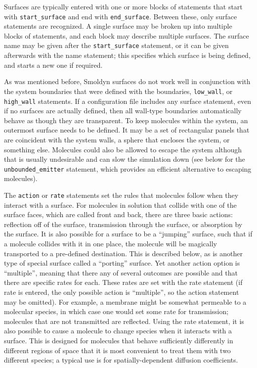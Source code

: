 \documentclass {scrbook}
\newcommand {\ttt} {\texttt}
\begin{document}
Surfaces are typically entered with one or more blocks of statements that start with \ttt{start\_surface} and end with \ttt{end\_surface}. Between these, only surface statements are recognized. A single surface may be broken up into multiple blocks of statements, and each block may describe multiple surfaces. The surface name may be given after the \ttt{start\_surface} statement, or it can be given afterwards with the name statement; this specifies which surface is being defined, and starts a new one if required.

As was mentioned before, Smoldyn surfaces do not work well in conjunction with the system boundaries that were defined with the boundaries, \ttt{low\_wall}, or \ttt{high\_wall} statements. If a configuration file includes any surface statement, even if no surfaces are actually defined, then all wall-type boundaries automatically behave as though they are transparent. To keep molecules within the system, an outermost surface needs to be defined. It may be a set of rectangular panels that are coincident with the system walls, a sphere that encloses the system, or something else. Molecules could also be allowed to escape the system although that is usually undesirable and can slow the simulation down (see below for the \ttt{unbounded\_emitter} statement, which provides an efficient alternative to escaping molecules).

The \ttt{action} or \ttt{rate} statements set the rules that molecules follow when they interact with a surface. For molecules in solution that collide with one of the surface faces, which are called front and back, there are three basic actions: reflection off of the surface, transmission through the surface, or absorption by the surface. It is also possible for a surface to be a ``jumping'' surface, such that if a molecule collides with it in one place, the molecule will be magically transported to a pre-defined destination. This is described below, as is another type of special surface called a ``porting'' surface. Yet another action option is ``multiple'', meaning that there any of several outcomes are possible and that there are specific rates for each. These rates are set with the rate statement (if rate is entered, the only possible action is ``multiple'', so the action statement may be omitted). For example, a membrane might be somewhat permeable to a molecular species, in which case one would set some rate for transmission; molecules that are not transmitted are reflected. Using the rate statement, it is also possible to cause a molecule to change species when it interacts with a surface. This is designed for molecules that behave sufficiently differently in different regions of space that it is most convenient to treat them with two different species; a typical use is for spatially-dependent diffusion coefficients.
\end{document}
